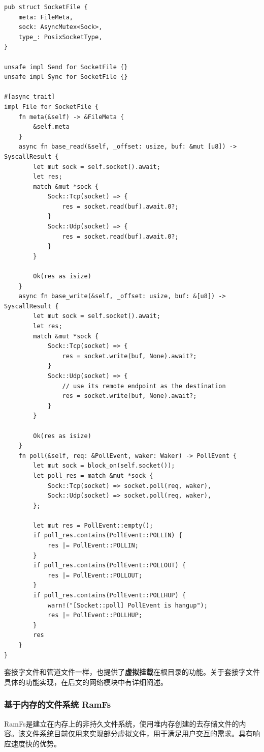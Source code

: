 \documentclass{article}
\begin{document}
\begin{lstlisting}
pub struct SocketFile {
    meta: FileMeta,
    sock: AsyncMutex<Sock>,
    type_: PosixSocketType,
}

unsafe impl Send for SocketFile {}
unsafe impl Sync for SocketFile {}

#[async_trait]
impl File for SocketFile {
    fn meta(&self) -> &FileMeta {
        &self.meta
    }
    async fn base_read(&self, _offset: usize, buf: &mut [u8]) -> SyscallResult {
        let mut sock = self.socket().await;
        let res;
        match &mut *sock {
            Sock::Tcp(socket) => {
                res = socket.read(buf).await.0?;
            }
            Sock::Udp(socket) => {
                res = socket.read(buf).await.0?;
            }
        }

        Ok(res as isize)
    }
    async fn base_write(&self, _offset: usize, buf: &[u8]) -> SyscallResult {
        let mut sock = self.socket().await;
        let res;
        match &mut *sock {
            Sock::Tcp(socket) => {
                res = socket.write(buf, None).await?;
            }
            Sock::Udp(socket) => {
                // use its remote endpoint as the destination
                res = socket.write(buf, None).await?;
            }
        }

        Ok(res as isize)
    }
    fn poll(&self, req: &PollEvent, waker: Waker) -> PollEvent {
        let mut sock = block_on(self.socket());
        let poll_res = match &mut *sock {
            Sock::Tcp(socket) => socket.poll(req, waker),
            Sock::Udp(socket) => socket.poll(req, waker),
        };

        let mut res = PollEvent::empty();
        if poll_res.contains(PollEvent::POLLIN) {
            res |= PollEvent::POLLIN;
        }
        if poll_res.contains(PollEvent::POLLOUT) {
            res |= PollEvent::POLLOUT;
        }
        if poll_res.contains(PollEvent::POLLHUP) {
            warn!("[Socket::poll] PollEvent is hangup");
            res |= PollEvent::POLLHUP;
        }
        res
    }
}
\end{lstlisting}

套接字文件和管道文件一样，也提供了\textbf{虚拟挂载}在根目录的功能。关于套接字文件具体的功能实现，在后文的网络模块中有详细阐述。

\subsubsection{基于内存的文件系统 RamFs}
RamFs是建立在内存上的非持久文件系统，使用堆内存创建的去存储文件的内容。该文件系统目前仅用来实现部分虚拟文件，用于满足用户交互的需求。具有响应速度快的优势。
\end{document}
